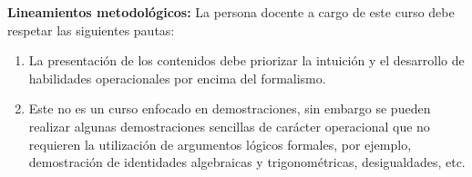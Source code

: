 \begin{refsection}
\noindent \textbf{Lineamientos metodológicos:} La persona docente a cargo de este curso debe respetar las siguientes pautas:
\begin{enumerate}
    \item La presentación de los contenidos debe priorizar la intuición y el desarrollo de habilidades operacionales por encima del formalismo. 
    \item Este no es un curso enfocado en demostraciones, sin embargo se pueden realizar algunas demostraciones sencillas de carácter operacional que no requieren la utilización de argumentos lógicos formales, por ejemplo, demostración de identidades algebraicas y trigonométricas, desigualdades, etc.
\end{enumerate}


\end{refsection}
